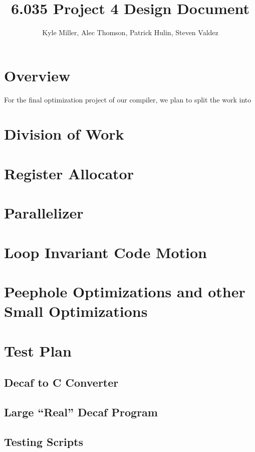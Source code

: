 \documentclass[11pt]{article}
\title{6.035 Project 4 Design Document}
\author{Kyle Miller, Alec Thomson, Patrick Hulin, Steven Valdez}
\begin{document}
\maketitle

\section {Overview} 

For the final optimization project of our compiler, we plan to split
the work into 

\section {Division of Work}

\section {Register Allocator}

\section {Parallelizer}

\section {Loop Invariant Code Motion}

\section {Peephole Optimizations and other Small Optimizations}

\section {Test Plan}

\subsection {Decaf to C Converter} 

\subsection {Large ``Real'' Decaf Program}

\subsection {Testing Scripts}
\end{document}
